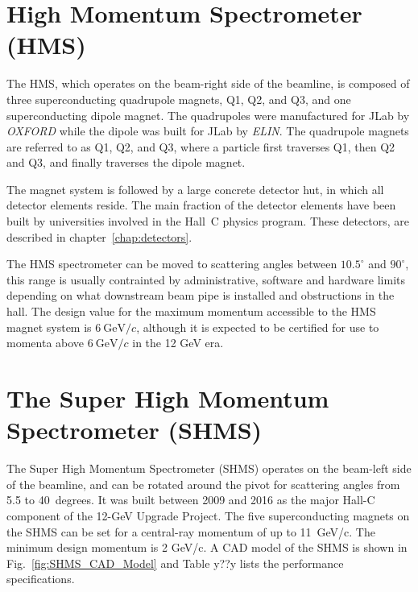{%

\section{High Momentum Spectrometer (HMS) }

The HMS, which operates on the beam-right side of the beamline, is
composed of three superconducting quadrupole magnets, Q1, Q2, and Q3,
and one superconducting dipole magnet. The quadrupoles were
manufactured for JLab by {\em OXFORD} while the dipole was built for
JLab by {\em ELIN}.  The quadrupole magnets are referred to as Q1, Q2,
and Q3, where a particle first traverses Q1, then Q2 and Q3, and
finally traverses the dipole magnet.


The magnet system is followed by a large concrete detector hut, in which all
detector elements reside. The main fraction of the detector elements have been
built by universities involved in the Hall~C physics program.  These
detectors, are described in chapter~\ref{chap:detectors}.

The HMS spectrometer can be moved to scattering angles between
$10.5^{\circ}$ and $90^{\circ}$, this range is usually contrainted by
administrative, software and hardware limits depending on what
downstream beam pipe is installed and obstructions in the hall.  The
design value for the maximum momentum accessible to the HMS magnet
system is $6~\textrm{GeV}/c$, although it is expected to be certified
for use to momenta above $6~\textrm{GeV}/c$ in the 12 GeV era.

\section{The Super High Momentum Spectrometer (SHMS)}
%
The Super High Momentum Spectrometer (SHMS) operates on the beam-left
side of the beamline, and can be rotated around the pivot for scattering angles from 5.5
to 40~degrees. It was built between 2009 and 2016 as the major
Hall-C component of the 12-GeV Upgrade Project.  The five superconducting
magnets on the SHMS can be set for a central-ray momentum of up to 11~GeV/c.
The minimum design momentum is 2 GeV/c. A CAD model of the SHMS is shown
in Fig.~\ref{fig:SHMS_CAD_Model} and Table y??y lists the performance specifications. 

}
